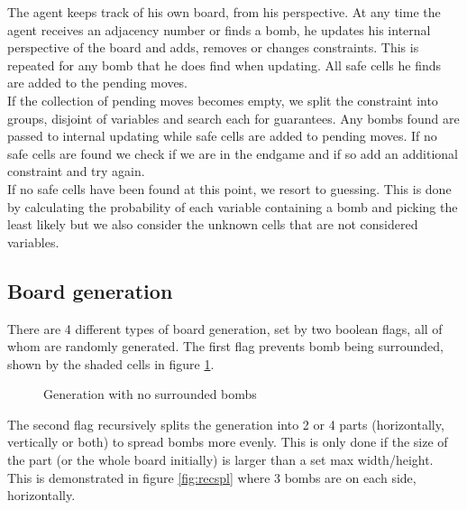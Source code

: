\documentclass[11pt,a4paper,notitlepage]{article}
\theoremstyle{definition}
\begin{document}
The agent keeps track of his own board, from his perspective. At any time the agent receives an adjacency number or finds a bomb, he updates his internal perspective of the board and adds, removes or changes constraints. This is repeated for any bomb that he does find when updating. All safe cells he finds are added to the pending moves.\\

If the collection of pending moves becomes empty, we split the constraint into groups, disjoint of variables and search each for guarantees. Any bombs found are passed to internal updating while safe cells are added to pending moves. If no safe cells are found we check if we are in the endgame and if so add an additional constraint and try again.\\

If no safe cells have been found at this point, we resort to guessing. This is done by calculating the probability of each variable containing a bomb and picking the least likely but we also consider the unknown cells that are not considered variables.

\subsection{Board generation}
There are 4 different types of board generation, set by two boolean flags, all of whom are randomly generated. The first flag prevents bomb being surrounded, shown by the shaded cells in figure \ref{fig:nosurr}.\\

\begin{figure}[h]
\begin{center}
\caption{Generation with no surrounded bombs}
\label{fig:nosurr}
\end{center}
\end{figure}

The second flag recursively splits the generation into 2 or 4 parts (horizontally, vertically or both) to spread bombs more evenly. This is only done if the size of the part (or the whole board initially) is larger than a set max width/height. This is demonstrated in figure \ref{fig:recspl} where 3 bombs are on each side, horizontally. 
\end{document}
